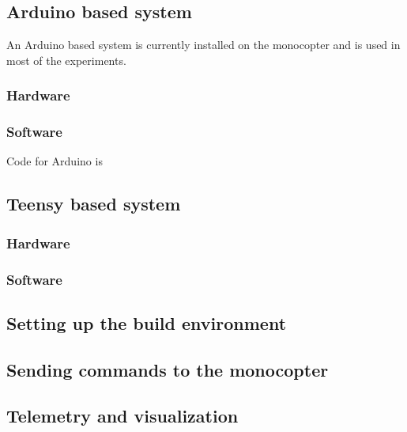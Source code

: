 \documentclass[12pt]{article}
\begin{document}
\subsection{Arduino based system}
An Arduino based system is currently installed on the monocopter and is used in most of the experiments. 
\subsubsection{Hardware}

\subsubsection{Software}
Code for Arduino is 

\subsection{Teensy based system}
\subsubsection{Hardware}
\subsubsection{Software}

\subsection{Setting up the build environment}
\subsection{Sending commands to the monocopter}
\subsection{Telemetry and visualization}
\end{document}
